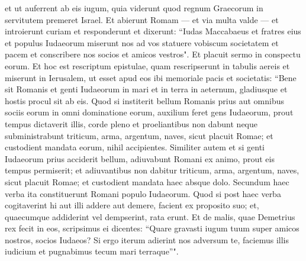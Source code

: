 \begin{biblechapter}
\verse et ut auferrent ab eis iugum, quia viderunt quod regnum Graecorum in servitutem premeret Israel. 
\verse Et abierunt Romam — et via multa valde — et introierunt curiam et responderunt et dixerunt: 
\verse “Iudas Maccabaeus et fratres eius et populus Iudaeorum miserunt nos ad vos statuere vobiscum societatem et pacem et conscribere nos socios et amicos vestros". 
\verse Et placuit sermo in conspectu eorum. 
\verse Et hoc est rescriptum epistulae, quam rescripserunt in tabulis aereis et miserunt in Ierusalem, ut esset apud eos ibi memoriale pacis et societatis: 
\verse “Bene sit Romanis et genti Iudaeorum in mari et in terra in aeternum, gladiusque et hostis procul sit ab eis. 
\verse Quod si institerit bellum Romanis prius aut omnibus sociis eorum in omni dominatione eorum, 
\verse auxilium feret gens Iudaeorum, prout tempus dictaverit illis, corde pleno 
\verse et proeliantibus non dabunt neque subministrabunt triticum, arma, argentum, naves, sicut placuit Romae; et custodient mandata eorum, nihil accipientes. 
\verse Similiter autem et si genti Iudaeorum prius acciderit bellum, adiuvabunt Romani ex animo, prout eis tempus permiserit; 
\verse et adiuvantibus non dabitur triticum, arma, argentum, naves, sicut placuit Romae; et custodient mandata haec absque dolo. 
\verse Secundum haec verba ita constituerunt Romani populo Iudaeorum. 
\verse Quod si post haec verba cogitaverint hi aut illi addere aut demere, facient ex proposito suo; et, quaecumque addiderint vel dempserint, rata erunt. 
\verse Et de malis, quae Demetrius rex fecit in eos, scripsimus ei dicentes: “Quare gravasti iugum tuum super amicos nostros, socios Iudaeos?  
\verse Si ergo iterum adierint nos adversum te, faciemus illis iudicium et pugnabimus tecum mari terraque”". 
\end{biblechapter}

